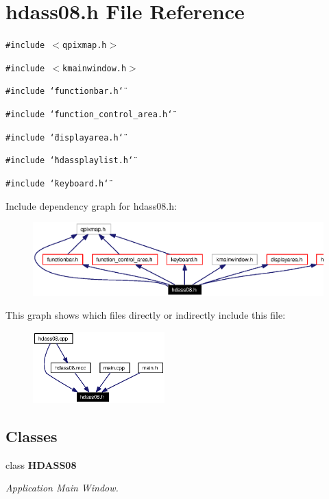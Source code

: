 \section{hdass08.h File Reference}
\label{hdass08_8h}


{\tt \#include $<$qpixmap.h$>$}\par
{\tt \#include $<$kmainwindow.h$>$}\par
{\tt \#include \char`\"{}functionbar.h\char`\"{}}\par
{\tt \#include \char`\"{}function\_\-control\_\-area.h\char`\"{}}\par
{\tt \#include \char`\"{}displayarea.h\char`\"{}}\par
{\tt \#include \char`\"{}hdassplaylist.h\char`\"{}}\par
{\tt \#include \char`\"{}keyboard.h\char`\"{}}\par


Include dependency graph for hdass08.h:\begin{figure}[H]
\begin{center}
\leavevmode
\includegraphics[width=332pt]{hdass08_8h__incl}
\end{center}
\end{figure}


This graph shows which files directly or indirectly include this file:\begin{figure}[H]
\begin{center}
\leavevmode
\includegraphics[width=144pt]{hdass08_8h__dep__incl}
\end{center}
\end{figure}
\subsection*{Classes}
\begin{CompactItemize}
\item 
class {\bf HDASS08}
\begin{CompactList}\small\item\em Application Main Window. \item\end{CompactList}\end{CompactItemize}
